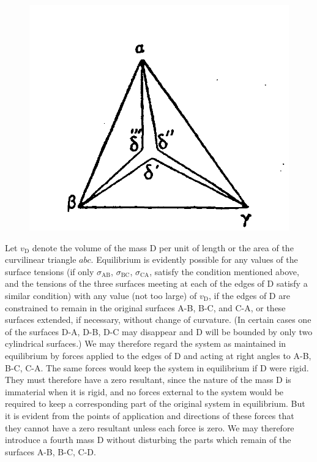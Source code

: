 \documentclass[12pt]{memoir}
\begin{document}
\begin{figure}
\begin{minipage}{.3\textwidth}
  \centering
  \includegraphics[width=\linewidth]{fig_16}
  \label{fig_16}
\end{minipage}
\end{figure}
Let $v_\text{D}$ denote the volume of the mass D per unit of length or the area of the curvilinear triangle $abc$. Equilibrium is evidently possible for any values of the surface tensions (if only $\sigma_{\text{AB}}$, $\sigma_{\text{BC}}$, $\sigma_{\text{CA}}$, satisfy the condition mentioned above, and the tensions of the three surfaces meeting at each of the edges of D satisfy a similar condition) with any value (not too large) of $v_\text{D}$, if the edges of D are constrained to remain in the original surfaces A-B, B-C, and C-A, or these surfaces extended, if necessary, without change of curvature. (In certain cases one of the surfaces D-A, D-B, D-C may disappear and D will be bounded by only two cylindrical surfaces.) We may therefore regard the system as maintained in equilibrium by forces applied to the edges of D and acting at right angles to A-B, B-C, C-A. The same forces would keep the system in equilibrium if D were rigid. They must therefore have a zero resultant, since the nature of the mass D is immaterial when it is rigid, and no forces external to the system would be required to keep a corresponding part of the original system in equilibrium. But it is evident from the points of application and directions of these forces that they cannot have a zero resultant unless each force is zero. We may therefore introduce a fourth mass D without disturbing the parts which remain of the surfaces A-B, B-C, C-D.
\end{document}
